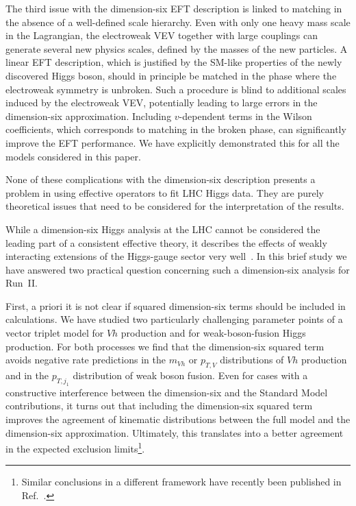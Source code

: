 The third issue with the dimension-six EFT description is linked to
matching in the absence of a well-defined scale hierarchy.  Even with
only one heavy mass scale in the Lagrangian, the electroweak VEV
together with large couplings can generate several new physics scales,
defined by the masses of the new particles.  A linear EFT description,
which is justified by the SM-like properties of the newly discovered
Higgs boson, should in principle be matched in the phase where the
electroweak symmetry is unbroken. Such a procedure is blind to
additional scales induced by the electroweak VEV, potentially leading
to large errors in the dimension-six approximation.  Including
$v$-dependent terms in the Wilson coefficients, which corresponds to
matching in the broken phase, can significantly improve the EFT
performance. We have explicitly demonstrated this for all the models
considered in this paper.

None of these complications with the dimension-six description presents
a problem in using effective operators to fit LHC Higgs data.  They
are purely theoretical issues that need to be considered for the
interpretation of the results.



While a dimension-six Higgs analysis at the LHC cannot be considered the
leading part of a consistent effective theory, it describes the
effects of weakly interacting extensions of the Higgs-gauge sector very
well~\cite{too_long}. In this brief study we have answered two practical
question concerning such a dimension-six analysis for Run~II.

First, a priori it is not clear if squared dimension-six terms should be
included in calculations. We have studied two particularly challenging
parameter points of a vector triplet model for $Vh$ production and for
weak-boson-fusion Higgs production. For both processes we find that
the dimension-six squared term avoids negative rate predictions in the
$m_{Vh}$ or $p_{T,V}$ distributions of $Vh$ production and in the
$p_{T,j_1}$ distribution of weak boson fusion. Even for cases with a
constructive interference between the dimension-six and the Standard
Model contributions, it turns out that including the dimension-six
squared term improves the agreement of kinematic distributions between
the full model and the dimension-six approximation. Ultimately, this
translates into a better agreement in the expected exclusion
limits\footnote{Similar conclusions in a different framework have recently
been published in Ref.~\cite{gino}.}.

